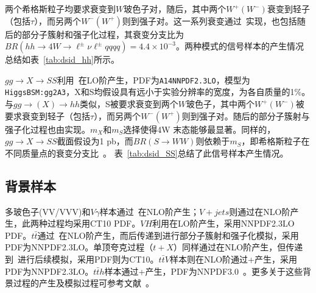 两个希格斯粒子均要求衰变到$W$玻色子对，随后，其中两个$W^{+}(W^{-})$衰变到轻子（包括$\tau$），而另两个$W^{-}(W^{+})$则到强子对。这一系列衰变通过\Herwigpp~\cite{herwigpp}实现，也包括随后的部分子簇射和强子化过程，其衰变分支比为$BR(hh\rightarrow 4W \rightarrow \ell^{\pm}\nu\ell^{\pm}qqqq)=4.4\times10^{-3}$。两种模式的信号样本的产生情况总结如表~\ref{tab:dsid_hh}所示。


$gg \rightarrow X \rightarrow SS$利用~\cite{pythia8}在LO阶产生，PDF为\texttt{A14NNPDF2.3LO}，模型为\texttt{HiggsBSM:gg2A3}，X和S均假设具有远小于实验分辨率的宽度，为各自质量的1\%。与$gg\rightarrow (X) \rightarrow hh$类似，S被要求衰变到两个$W$玻色子，其中两个$W^{+}(W^{-})$被要求衰变到轻子（包括$\tau$），而另两个$W^{-}(W^{+})$则到强子对。随后的部分子簇射与强子化过程也由实现。$m_X$和$m_S$选择使得4W 末态能够最显著。同样的，$gg \rightarrow X \rightarrow SS$截面假设为1 pb，而$BR(S\rightarrow WW)$则依赖于$m_S$，即希格斯粒子在不同质量点的衰变分支比~\cite{Denner:2011mq}。
表~\ref{tab:dsid_SS}总结了此信号样本产生情况。


\subsection{背景样本}
多玻色子(VV/VVV)和$V\gamma$样本通过~\cite{sherpa}在NLO阶产生；$V+jets$则通过在NLO阶产生，此两种过程均采用CT10 PDF。$VH$利用在LO阶产生，采用NNPDF2.3LO PDF。$t\bar{t}$通过~\cite{powhegbox}在NLO阶产生，而后传递到进行部分子簇射和强子化模拟，采用PDF为NNPDF2.3LO。单顶夸克过程（$t+X$）同样通过在NLO阶产生，但传递到~\cite{pythia6}进行后续模拟，采用PDF则为CT10。$t\bar{t}V$样本则在NLO阶通过\MGMCatNLO+产生，采用PDF为NNPDF2.3LO。$t\bar{t}h$样本通过\MGMCatNLO+\Herwigpp 产生，PDF为NNPDF3.0~\cite{PDF:NNPDF30}。更多关于这些背景过程的产生及模拟过程可参考文献~\cite{ATL-PHYS-PUB-2016-004,ATL-PHYS-PUB-2016-005,ATL-PHYS-PUB-2016-002}。

